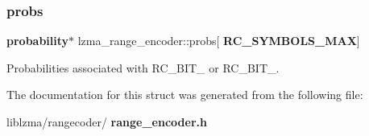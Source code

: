 \mbox{\label{structlzma__range__encoder_a9748a5417508b9cba69428f65373177b}} 
\subsubsection{probs}
{\footnotesize\ttfamily \textbf{ probability}$\ast$ lzma\+\_\+range\+\_\+encoder\+::probs[\textbf{ R\+C\+\_\+\+S\+Y\+M\+B\+O\+L\+S\+\_\+\+M\+AX}]}



Probabilities associated with R\+C\+\_\+\+B\+I\+T\+\_ or R\+C\+\_\+\+B\+I\+T\+\_. 



The documentation for this struct was generated from the following file\+:\begin{DoxyCompactItemize}
\item 
liblzma/rangecoder/\textbf{ range\+\_\+encoder.\+h}\end{DoxyCompactItemize}
